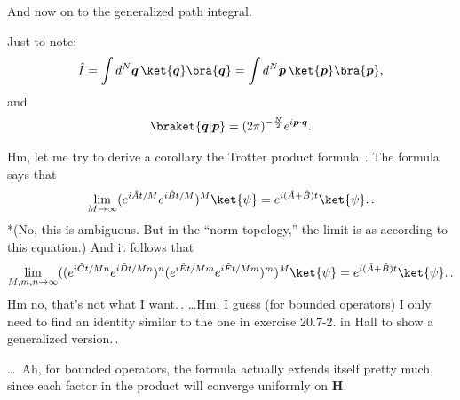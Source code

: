\documentclass{report}
\begin{document}
And now on to the generalized path integral.

Just to note:
\begin{align}
	\hat I = 
		\int d^N \boldsymbol q\, \ket{\boldsymbol q}\bra{\boldsymbol q} = 
		\int d^N \boldsymbol p\, \ket{\boldsymbol p}\bra{\boldsymbol p},
\end{align}
and 
\begin{align}
\begin{aligned}
	\braket{\boldsymbol q | \boldsymbol p} =
		(2 \pi)^{-\frac{N}{2}} e^{i \boldsymbol p \cdot \boldsymbol q}.
\end{aligned}
\end{align} 


Hm, let me try to derive a corollary the Trotter product formula.\,. The formula says that
\begin{align}
\begin{aligned}
	\lim_{M\to \infty} (e^{i \hat A t / M} e^{i \hat B t / M})^M \ket{\psi} = 
		e^{i (\hat A + \hat B) t} \ket{\psi}.\,.
\end{aligned}
\end{align} 
*(No, this is ambiguous. But in the ``norm topology,'' the limit is as according to this equation.) And it follows that
\begin{align}
\begin{aligned}
	\lim_{M, m, n \to \infty} (
		(e^{i \hat C t / M n} e^{i \hat D t / M n})^n
		(e^{i \hat E t / M m} e^{i \hat F t / M m})^m
	)^M \ket{\psi} = 
		e^{i (\hat A + \hat B) t} \ket{\psi}.\,.
\end{aligned}
\end{align} 
Hm no, that's not what I want.\,. \ldots Hm, I guess (for bounded operators) I only need to find an identity similar to the one in exercise 20.7-2. in Hall to show a generalized version.\,. %

\ldots\ Ah, for bounded operators, the formula actually extends itself pretty much, since each factor in the product will converge uniformly on \textbf{H}.  
\end{document}
